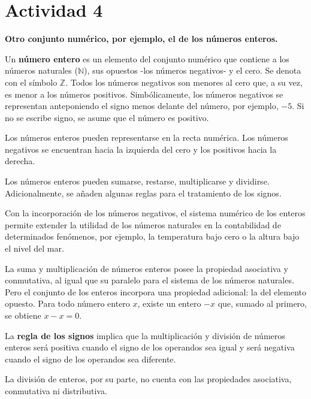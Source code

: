 \section*{Actividad 4}
\textbf{Otro conjunto numérico, por ejemplo, el de los números enteros.}

Un \textbf{número entero} es un elemento del conjunto numérico que contiene a los números naturales ($\mathbb{N}$), sus opuestos -los números negativos- y el cero. Se denota con el símbolo $\mathbb{Z}$. Todos los números negativos son menores al cero que, a su vez, es menor a los números positivos. Simbólicamente, los números negativos se representan anteponiendo el signo menos delante del número, por ejemplo, $-5$. Si no se escribe signo, se asume que el número es positivo.

Los números enteros pueden representarse en la recta numérica. Los números negativos se encuentran hacia la izquierda del cero y los positivos hacia la derecha. 

Los números enteros pueden sumarse, restarse, multiplicarse y dividirse. Adicionalmente, se añaden algunas reglas para el tratamiento de los signos.

Con la incorporación de los números negativos, el sistema numérico de los enteros permite extender la utilidad de los números naturales en la contabilidad de determinados fenómenos, por ejemplo, la temperatura bajo cero o la altura bajo el nivel del mar.

La suma y multiplicación de números enteros posee la propiedad asociativa y conmutativa, al igual que su paralelo para el sistema de los números naturales. Pero el conjunto de los enteros incorpora una propiedad adicional: la del elemento opuesto. Para todo número entero $x$, existe un entero $-x$ que, sumado al primero, se obtiene $x - x = 0$.

La \textbf{regla de los signos} implica que la multiplicación y división de números enteros será positiva cuando el signo de los operandos sea igual y será negativa cuando el signo de los operandos sea diferente. 

La división de enteros, por su parte, no cuenta con las propiedades asociativa, conmutativa ni distributiva.
